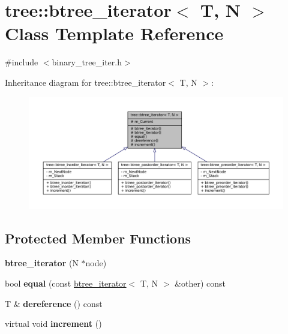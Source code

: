 \hypertarget{classtree_1_1btree__iterator}{\section{tree\-:\-:btree\-\_\-iterator$<$ \-T, \-N $>$ \-Class \-Template \-Reference}
\label{classtree_1_1btree__iterator}
}


{\ttfamily \#include $<$binary\-\_\-tree\-\_\-iter.\-h$>$}



\-Inheritance diagram for tree\-:\-:btree\-\_\-iterator$<$ \-T, \-N $>$\-:
\nopagebreak
\begin{figure}[H]
\begin{center}
\leavevmode
\includegraphics[width=350pt]{classtree_1_1btree__iterator__inherit__graph}
\end{center}
\end{figure}
\subsection*{\-Protected \-Member \-Functions}
\begin{DoxyCompactItemize}
\item 
\hypertarget{classtree_1_1btree__iterator_a9d7d63a542d5ed607bc93363080b247f}{{\bfseries btree\-\_\-iterator} (\-N $\ast$node)}\label{classtree_1_1btree__iterator_a9d7d63a542d5ed607bc93363080b247f}

\item 
\hypertarget{classtree_1_1btree__iterator_adaa03d21cddbb44f64abdfcfc92a15b4}{bool {\bfseries equal} (const \hyperlink{classtree_1_1btree__iterator}{btree\-\_\-iterator}$<$ \-T, \-N $>$ \&other) const }\label{classtree_1_1btree__iterator_adaa03d21cddbb44f64abdfcfc92a15b4}

\item 
\hypertarget{classtree_1_1btree__iterator_a2614a710559163bd7f8b8b9ea2998073}{\-T \& {\bfseries dereference} () const }\label{classtree_1_1btree__iterator_a2614a710559163bd7f8b8b9ea2998073}

\item 
\hypertarget{classtree_1_1btree__iterator_ac226882e50211134cae92e2d3a70a05a}{virtual void {\bfseries increment} ()}\label{classtree_1_1btree__iterator_ac226882e50211134cae92e2d3a70a05a}

\end{DoxyCompactItemize}
